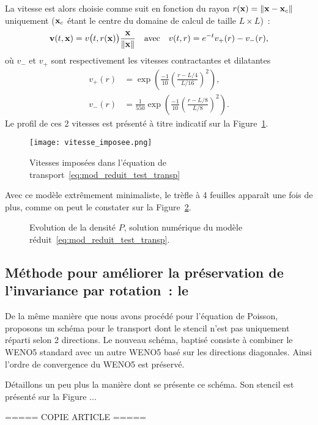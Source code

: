 \documentclass[main.tex]{subfiles}
\begin{document}
La vitesse est alors choisie comme suit en fonction du rayon $r(\mathbf{x})=\| \mathbf{x} - \mathbf{x}_c \|$ uniquement ($\mathbf{x}_c$ étant le centre du domaine de calcul de taille $L\times L$)~:
\begin{equation}
\mathbf{v}(t,\mathbf{x})=v\big(t,r(\mathbf{x})\big)\frac{\mathbf{x}}{\|\mathbf{x} \|} \quad \textrm{avec} \quad v(t,r) = e^{-t} v_+(r) - v_-(r),
\end{equation}
où $v_-$ et $v_+$ sont respectivement les vitesses contractantes et dilatantes
\begin{align}
v_+(r)&=\exp\left( \frac{-1}{10} \left(\frac{r-L/4}{L/16} \right)^2 \right), \\
v_-(r)&= \frac{1}{550} \exp\left( \frac{-1}{10} \left(\frac{r-L/8}{L/8} \right)^2 \right).
\end{align}
Le profil de ces 2 vitesses est présenté à titre indicatif sur la Figure~\ref{fig:vitesse+et-imposees}.
\begin{figure}
\centering
\texttt{[image: vitesse\_imposee.png]}
\caption{Vitesses imposées dans l'équation de transport~\eqref{eq:mod_reduit_test_transp}\label{fig:vitesse+et-imposees} }
\end{figure}
Avec ce modèle extrêmement minimaliste, le trèfle à 4 feuilles apparaît une fois de plus, comme on peut le constater sur la Figure~\ref{fig:evo_test_transp}.
\begin{figure}
\caption{Evolution de la densité $P$, solution numérique du modèle réduit~\eqref{eq:mod_reduit_test_transp}.\label{fig:evo_test_transp}}
\end{figure}

\subsection{Méthode pour améliorer la préservation de l'invariance par rotation~: le \twinweno  \label{sec:twinweno}}
De la même manière que nous avons procédé pour l'équation de Poisson, proposons un schéma pour le transport dont le stencil n'est pas uniquement réparti selon 2 directions. Le nouveau schéma, baptisé \twinweno consiste à combiner le WENO5 standard avec un autre WENO5 basé sur les directions diagonales. Ainsi l'ordre de convergence du WENO5 est préservé.

Détaillons un peu plus la manière dont se présente ce schéma. Son stencil est présenté sur la Figure ...

\begin{center}
===== COPIE ARTICLE =====
\end{center}
\end{document}
